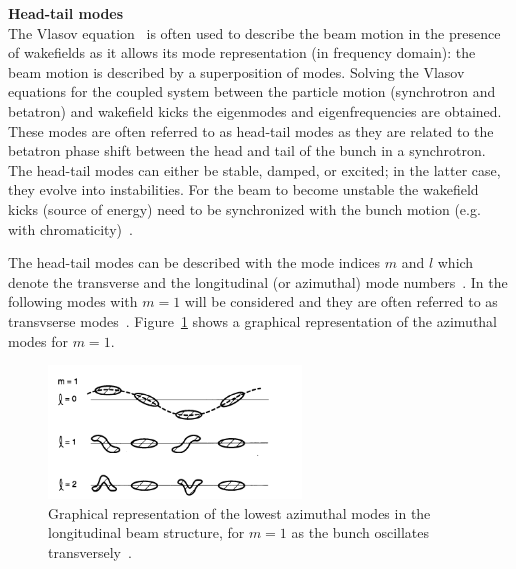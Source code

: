 
\textbf{Head-tail modes}\\
The Vlasov equation~\cite{Vlasov:426186} is often used to describe the beam motion in the presence of wakefields as it allows its mode representation (in frequency domain): the beam motion is described by a superposition of modes. %
Solving the Vlasov equations for the coupled system between the particle motion (synchrotron and betatron) and wakefield kicks the eigenmodes and eigenfrequencies are obtained. These modes are often referred to as head-tail modes as they are related to the betatron phase shift between the head and tail of the bunch in a synchrotron. The head-tail modes can either be stable, damped, or excited; in the latter case, they evolve into instabilities. For the beam to become unstable the wakefield kicks (source of energy) need to be synchronized with the bunch motion (e.g. with chromaticity)~\cite{instabilities_rumulo_li}.

The head-tail modes can be described with the mode indices $m$ and $l$ which denote the transverse and the longitudinal (or azimuthal) mode numbers~\cite{Chao:collective}. In the following modes with $m=1$ will be considered and they are often referred to as transvserse modes~\cite{Chao:collective}. Figure~\ref{fig:azimuthal_mode} shows a graphical representation of the azimuthal modes for $m=1$.

\begin{figure}[!h] %
    \centering         
    \includegraphics[width=0.6\textwidth]{images/Ch2/transverse_mode_l.png}
        \caption{Graphical representation of the lowest azimuthal modes in the longitudinal beam structure, for $m=1$ as the bunch oscillates transversely~\cite{Chao:collective}. } 
        \label{fig:azimuthal_mode}
 \end{figure}
 
